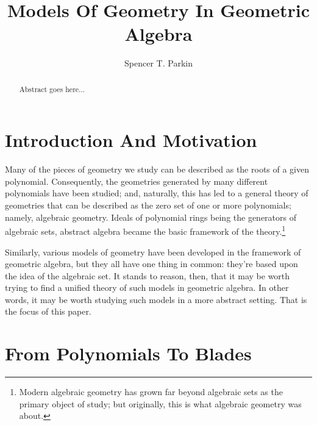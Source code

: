 \documentclass{birkjour}
\theoremstyle{definition}
\theoremstyle{remark}
\numberwithin{equation}{section}
\begin{document}
\title{Models Of Geometry In Geometric Algebra}

\author{Spencer T. Parkin}
\address{102 W. 500 S., \\
Salt Lake City, UT  84101} 



\begin{abstract}
Abstract goes here...
\end{abstract}


\maketitle

\section{Introduction And Motivation}

Many of the pieces of geometry we study can be described as the roots
of a given polynomial.  Consequently, the geometries generated by many different
polynomials have been studied; and, naturally, this has led to a general theory
of geometries that can be described as the zero set of one or more polynomials; namely, algebraic
geometry.  Ideals of polynomial rings being the generators of algebraic sets,
abstract algebra became the basic framework of the theory.\footnote{Modern
algebraic geometry has grown far beyond algebraic sets as the primary object of study;
but originally, this is what algebraic geometry was about.}

Similarly, various models of geometry have been developed in the framework
of geometric algebra, but they all have one thing in common: they're based
upon the idea of the algebraic set.  It stands to reason, then, that it may be
worth trying to find a unified theory of such models in geometric algebra.
In other words, it may be worth studying such models in a more abstract setting.
That is the focus of this paper.

\section{From Polynomials To Blades}
\end{document}
